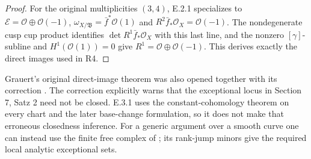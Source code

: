 \begin{proof}
For the original multiplicities $(3,4)$, E.2.1 specializes to
$\mathcal E=\mathcal O\oplus\mathcal O(-1)$,
$\omega_{X/\mathfrak B}=\bar f^*\mathcal O(1)$ and
$R^2\bar f_*\mathcal O_X=\mathcal O(-1)$.
The nondegenerate cusp cup product identifies
$\det R^1\bar f_*\mathcal O_X$ with this last line, and the
nonzero $[\gamma]$-subline and $H^1(\mathcal O(1))=0$ give
$R^1=\mathcal O\oplus\mathcal O(-1)$.
This derives exactly the direct images used in R4.
\end{proof}

Grauert's original direct-image theorem
\cite[Section 6, Hauptsatz I, and Section 7, Satz 5]{Grauert60push}
was also opened together with its correction \cite{Grauert63push}.
The correction explicitly warns that the exceptional locus in
Section 7, Satz 2 need not be closed.  E.3.1 uses the
constant-cohomology theorem on every chart and the later
base-change formulation, so it does not make that erroneous
closedness inference.  For a generic argument over a smooth
curve one can instead use the finite free complex of
\cite[Chapter III, Theorem 4.1]{BS76push}; its rank-jump minors
give the required local analytic exceptional sets.

